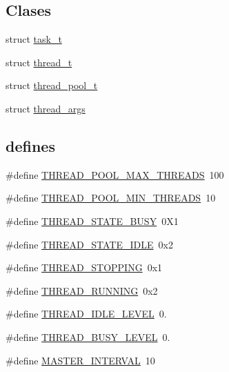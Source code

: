\subsection*{Clases}
\begin{DoxyCompactItemize}
\item 
struct \hyperlink{structtask__t}{task\+\_\+t}
\item 
struct \hyperlink{structthread__t}{thread\+\_\+t}
\item 
struct \hyperlink{structthread__pool__t}{thread\+\_\+pool\+\_\+t}
\item 
struct \hyperlink{structthread__args}{thread\+\_\+args}
\end{DoxyCompactItemize}
\subsection*{\textquotesingle{}defines\textquotesingle{}}
\begin{DoxyCompactItemize}
\item 
\#define \hyperlink{G-2313-06-P1__thread__pool_8h_a1d5f9a0a6439db9d27573f4ea768e03a}{T\+H\+R\+E\+A\+D\+\_\+\+P\+O\+O\+L\+\_\+\+M\+A\+X\+\_\+\+T\+H\+R\+E\+A\+D\+S}~100
\item 
\#define \hyperlink{G-2313-06-P1__thread__pool_8h_a2dddf10750568983fb5e8793f467e170}{T\+H\+R\+E\+A\+D\+\_\+\+P\+O\+O\+L\+\_\+\+M\+I\+N\+\_\+\+T\+H\+R\+E\+A\+D\+S}~10
\item 
\#define \hyperlink{G-2313-06-P1__thread__pool_8h_a91780ed988c2db43eb70b7106cee217b}{T\+H\+R\+E\+A\+D\+\_\+\+S\+T\+A\+T\+E\+\_\+\+B\+U\+S\+Y}~0\+X1
\item 
\#define \hyperlink{G-2313-06-P1__thread__pool_8h_a7fb00c8fb812a4f9a1c08e22a95104a1}{T\+H\+R\+E\+A\+D\+\_\+\+S\+T\+A\+T\+E\+\_\+\+I\+D\+L\+E}~0x2
\item 
\#define \hyperlink{G-2313-06-P1__thread__pool_8h_acef14a4788dacf3640cf28745cf49726}{T\+H\+R\+E\+A\+D\+\_\+\+S\+T\+O\+P\+P\+I\+N\+G}~0x1
\item 
\#define \hyperlink{G-2313-06-P1__thread__pool_8h_a9c22e7eceaed2a27b40b3bd043c1d057}{T\+H\+R\+E\+A\+D\+\_\+\+R\+U\+N\+N\+I\+N\+G}~0x2
\item 
\#define \hyperlink{G-2313-06-P1__thread__pool_8h_a9466670765f7653fc75437eb55c472f3}{T\+H\+R\+E\+A\+D\+\_\+\+I\+D\+L\+E\+\_\+\+L\+E\+V\+E\+L}~0.
\item 
\#define \hyperlink{G-2313-06-P1__thread__pool_8h_a09199434ab101700c051a235cf740f30}{T\+H\+R\+E\+A\+D\+\_\+\+B\+U\+S\+Y\+\_\+\+L\+E\+V\+E\+L}~0.
\item 
\#define \hyperlink{G-2313-06-P1__thread__pool_8h_a562492e441dc328fba8a344c7206758a}{M\+A\+S\+T\+E\+R\+\_\+\+I\+N\+T\+E\+R\+V\+A\+L}~10
\end{DoxyCompactItemize}
